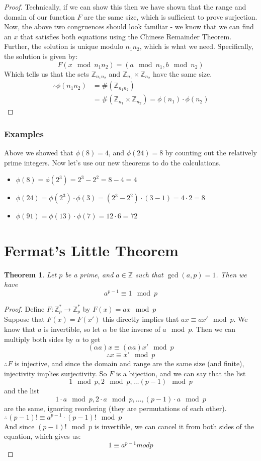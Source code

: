 \documentclass[10pt]{article}
\newcommand{\Z}{\mathbb{Z}}
\newtheorem{theorem}{Theorem}
\theoremstyle{definition}
\theoremstyle{remark}
\def\Z{\mathbb{ Z}}
\begin{document}
\begin{proof}
Technically, if we can show this then we have shown that the range and domain of our function $F$ are the same size, which is sufficient to prove surjection.  Now, the above two congruences should look familiar - we know that we can find an $x$ that satisfies both equations using the Chinese Remainder Theorem.  Further, the solution is unique modulo $n_1n_2$, which is what we need.  Specifically, the solution is given by: $$F(x \mod n_1 n_2) = (a \mod n_1, b \mod n_2)$$ Which tells us that the sets $\Z_{n_1n_2}$ and $\Z_{n_1} \times \Z_{n_2}$ have the same size.\\
\begin{align*}
\therefore \phi(n_1n_2) &= \#(\Z_{n_1n_2}) \\
&= \#(\Z_{n_1} \times \Z_{n_2}) = \phi(n_1) \cdot \phi(n_2)
\end{align*}
\end{proof}
\subsubsection{Examples}\label{composite_euler_examples}
Above we showed that $\phi(8) = 4$, and $\phi(24) = 8$ by counting out the relatively prime integers.  Now let's use our new theorems to do the calculations.
\begin{itemize}
\item $\phi(8) = \phi(2^3) = 2^3-2^2 = 8-4 = 4$
\item $\phi(24) = \phi(2^3) \cdot \phi(3) = (2^3-2^2) \cdot (3-1) = 4 \cdot 2 = 8$
\item $\phi(91) = \phi(13) \cdot \phi(7) = 12 \cdot 6 = 72$
\end{itemize}
\section{Fermat’s Little Theorem}
\begin{theorem}
Let $p$ be a prime, and $a \in \Z$ such that $\gcd(a,p) = 1$.  Then we have $$a^{p-1} \equiv 1 \mod p$$
\end{theorem}
\begin{proof}
Define $F: \Z^*_p \to \Z^*_p$ by $F(x) = ax \mod p$\\
Suppose that $F(x) = F(x')$ this directly implies that $ax \equiv ax' \mod p$.  We know that $a$ is invertible, so let $\alpha$ be the inverse of $a \mod p$.  Then we can multiply both sides by $\alpha$ to get 
$$(\alpha a)x \equiv (\alpha a)x' \mod p$$
$$\therefore x \equiv x' \mod p$$
$\therefore F$ is injective, and since the domain and range are the same size (and finite), injectivity implies surjectivity.  So $F$ is a bijection, and we can say that the list
$$ 1 \mod p, 2 \mod p, \ldots (p-1) \mod p $$
and the list
$$ 1\cdot a \mod p, 2 \cdot a \mod p, \ldots, (p-1)\cdot a \mod p$$
are the same, ignoring reordering (they are permutations of each other).\\
$\therefore (p-1)! \equiv a^{p-1} \cdot (p-1)! \mod p$\\
And since $(p-1)! \mod p$ is invertible, we can cancel it from both sides of the equation, which gives us:
$$1 \equiv a^{p-1} mod p$$
\end{proof}
\end{document}
